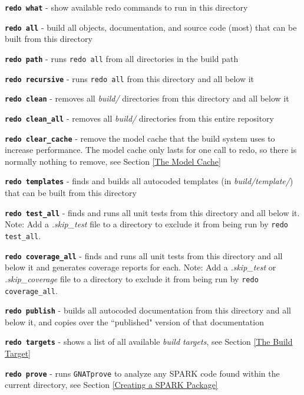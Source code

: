 \begin{spaceditemize}
  \item \textbf{\texttt{redo what}} - show available redo commands to run in this directory
  \item \textbf{\texttt{redo all}} - build all objects, documentation, and source code (most) that can be built from this directory
  \item \textbf{\texttt{redo path}} - runs \texttt{redo all} from all directories in the build path
  \item \textbf{\texttt{redo recursive}} - runs \texttt{redo all} from this directory and all below it
  \item \textbf{\texttt{redo clean}} - removes all \textit{build/} directories from this directory and all below it
  \item \textbf{\texttt{redo clean\_all}} - removes all \textit{build/} directories from this entire repository
  \item \textbf{\texttt{redo clear\_cache}} - remove the model cache that the build system uses to increase performance. The model cache only lasts for one call to redo, so there is normally nothing to remove, see Section \ref{The Model Cache}
  \item \textbf{\texttt{redo templates}} - finds and builds all autocoded templates (in \textit{build/template/}) that can be built from this directory
  \item \textbf{\texttt{redo test\_all}} - finds and runs all unit tests from this directory and all below it. Note: Add a \textit{.skip\_test} file to a directory to exclude it from being run by \texttt{redo test\_all}.
  \item \textbf{\texttt{redo coverage\_all}} - finds and runs all unit tests from this directory and all below it and generates coverage reports for each. Note: Add a \textit{.skip\_test} or \textit{.skip\_coverage} file to a directory to exclude it from being run by \texttt{redo coverage\_all}.
  \item \textbf{\texttt{redo publish}} - builds all autocoded documentation from this directory and all below it, and copies over the ``published" version of that documentation
  \item \textbf{\texttt{redo targets}} - shows a list of all available \textit{build targets}, see Section \ref{The Build Target}
  \item \textbf{\texttt{redo prove}} - runs \texttt{GNATprove} to analyze any SPARK code found within the current directory, see Section \ref{Creating a SPARK Package}

\end{spaceditemize}
